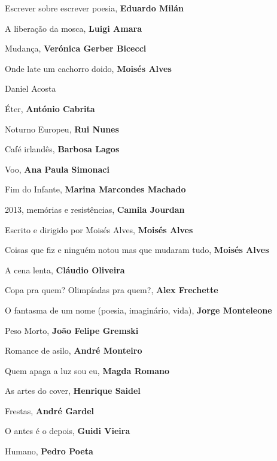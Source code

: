\begin{multicols}{2}
\begin{enumerate}
{\item Escrever sobre escrever poesia, \textbf{Eduardo Milán}
\item A liberação da mosca, \textbf{Luigi Amara}
\item Mudança, \textbf{Verónica Gerber Bicecci}
\item Onde late um cachorro doido, \textbf{Moisés Alves}
\item Daniel Acosta
\item Éter, \textbf{António Cabrita}
\item Noturno Europeu, \textbf{Rui Nunes}
\item Café irlandês, \textbf{Barbosa Lagos}
\item Voo, \textbf{Ana Paula Simonaci}
\item Fim do Infante, \textbf{Marina Marcondes Machado}
\item 2013, memórias e resistências, \textbf{Camila Jourdan}
\item Escrito e dirigido por Moisés Alves, \textbf{Moisés Alves}
\item Coisas que fiz e ninguém notou mas que mudaram tudo, \textbf{Moisés Alves}
\item A cena lenta, \textbf{Cláudio Oliveira}
\item Copa pra quem? Olimpíadas pra quem?, \textbf{Alex Frechette}
\item O fantasma de um nome (poesia, imaginário, vida), \textbf{Jorge Monteleone}
\item Peso Morto, \textbf{João Felipe Gremski}
\item Romance de asilo, \textbf{André Monteiro}
\item Quem apaga a luz sou eu, \textbf{Magda Romano}
\item As artes do cover, \textbf{Henrique Saidel}
\item Frestas, \textbf{André Gardel}
\item O antes é o depois, \textbf{Guidi Vieira}
\item Humano, \textbf{Pedro Poeta}
}
\end{enumerate}
\end{multicols}

\pagebreak
